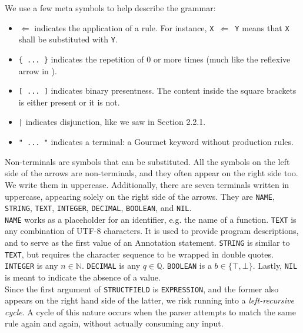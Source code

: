 We use a few meta symbols to help describe the grammar:

\begin{itemize}
    \item $\Leftarrow$ indicates the application of a rule. For instance, \texttt{X $\Leftarrow$ Y} means that \texttt{X} shall be substituted with \texttt{Y}.
    \item \texttt{\{ ... \}} indicates the repetition of 0 or more times (much like the reflexive arrow in ).
    \item  \texttt{[ ... ]} indicates binary presentness. The content inside the square brackets is either present or it is not.
    \item \texttt{|} indicates disjunction, like we saw in Section 2.2.1.
    \item \texttt{" ... "} indicates a terminal: a Gourmet keyword without production rules.
\end{itemize}

Non-terminals are symbols that can be substituted. All the symbols on the left side of the arrows are non-terminals, and they often appear on the right side too. We write them in uppercase. Additionally, there are seven terminals written in uppercase, appearing solely on the right side of the arrows. They are \texttt{NAME}, \texttt{STRING}, \texttt{TEXT}, \texttt{INTEGER}, \texttt{DECIMAL}, \texttt{BOOLEAN}, and \texttt{NIL}. \\

\texttt{NAME} works as a placeholder for an identifier, e.g. the name of a function. \texttt{TEXT} is any combination of UTF-8 characters. It is used to provide program descriptions, and to serve as the first value of an Annotation statement. \texttt{STRING} is similar to \texttt{TEXT}, but requires the character sequence to be wrapped in double quotes. \texttt{INTEGER} is any $n \in \mathbb{N}$. \texttt{DECIMAL} is any $q \in \mathbb{Q}$. \texttt{BOOLEAN} is a $b \in \{\top, \bot \}$. Lastly, \texttt{NIL} is meant to indicate the absence of a value. \\

Since the first argument of \texttt{STRUCTFIELD} is \texttt{EXPRESSION}, and the former also appears on the right hand side of the latter, we risk running into a \textit{left-recursive cycle}. A cycle of this nature occurs when the parser attempts to match the same rule again and again, without actually consuming any input. \\

